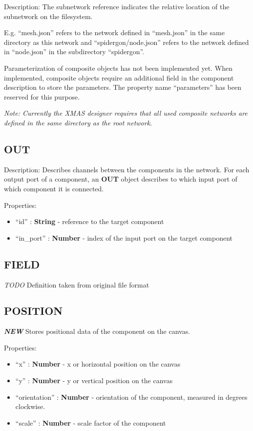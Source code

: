 Description: The subnetwork reference indicates the relative location of
the subnetwork on the filesystem.

E.g. ``mesh.json'' refers to the network defined in ``mesh.json'' in the
same directory as this network and ``spidergon/node.json'' refers to the
network defined in ``node.json'' in the subdirectory ``spidergon''.

Parameterization of composite objects has not been implemented yet. When
implemented, composite objects require an additional field in the
component description to store the parameters. The property name
``parameters'' has been reserved for this purpose.

\emph{Note: Currently the XMAS designer requires that all used composite
networks are defined in the same directory as the root network.}

\subsection{OUT}\label{out}

Description: Describes channels between the components in the network.
For each output port of a component, an \textbf{OUT} object describes to
which input port of which component it is connected.

Properties:

\begin{itemize}
\itemsep1pt\parskip0pt
\item
  ``id'' : \textbf{String} - reference to the target component
\item
  ``in\_port'' : \textbf{Number} - index of the input port on the target
  component
\end{itemize}

\subsection{FIELD}\label{field}

\emph{TODO} Definition taken from original file format

\subsection{POSITION}\label{position}

\textbf{\emph{NEW}} Stores positional data of the component on the
canvas.

Properties:

\begin{itemize}
\itemsep1pt\parskip0pt
\item
  ``x'' : \textbf{Number} - x or horizontal position on the canvas
\item
  ``y'' : \textbf{Number} - y or vertical position on the canvas
\item
  ``orientation'' : \textbf{Number} - orientation of the component,
  measured in degrees clockwise.
\item
  ``scale'' : \textbf{Number} - scale factor of the component
\end{itemize}

